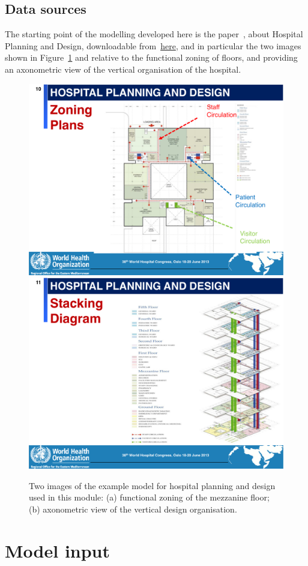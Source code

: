 \documentclass[11pt,oneside]{article}    %
\begin{document}
\subsection{Data sources}

The starting point of the modelling developed here is the paper~\cite{who:2013}, about Hospital Planning and Design, downloadable from~\href{http://paoluzzi.dia.uniroma3.it/web/hospital-planning-and-design.pdf}{here}, and in particular the two images shown in Figure~\ref{fig:hismail} and relative to the functional zoning of floors, and providing an axonometric view of the vertical organisation of the hospital.

\begin{figure}[htbp] %
   \centering
   \includegraphics[width=0.495\linewidth]{images/hismail-1} 
   \includegraphics[width=0.495\linewidth]{images/hismail-2} 
   \caption{Two images of the example model for hospital planning and design used in this module: (a) functional zoning of the mezzanine floor; (b) axonometric view of the vertical design organisation.}
   \label{fig:hismail}
\end{figure}


\section{Model input}
\end{document}
